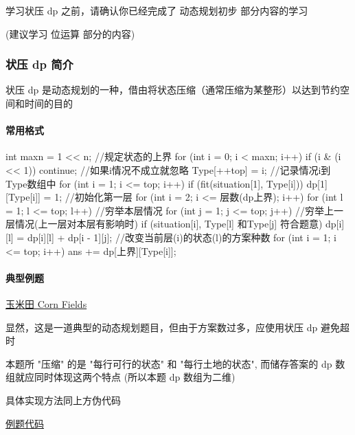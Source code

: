 
学习状压 dp 之前，请确认你已经完成了 动态规划初步 部分内容的学习

(建议学习 位运算 部分的内容)

\subsubsection{状压 dp 简介}

状压 dp 是动态规划的一种，借由将状态压缩（通常压缩为某整形）以达到节约空间和时间的目的

\paragraph{常用格式}

\begin{cppcode}
int maxn = 1 << n;  //规定状态的上界
for (int i = 0; i < maxn; i++) {
  if (i & (i << 1)) continue;  //如果i情况不成立就忽略
  Type[++top] = i;             //记录情况i到Type数组中
}
for (int i = 1; i <= top; i++) {
  if (fit(situation[1], Type[i])) dp[1][Type[i]] = 1;  //初始化第一层
}
for (int i = 2; i <= 层数(dp上界); i++) {
  for (int l = 1; l <= top; l++)  //穷举本层情况
    for (int j = 1; j <= top; j++)  //穷举上一层情况(上一层对本层有影响时)
      if (situation[i], Type[l] 和Type[j] 符合题意)
        dp[i][l] = dp[i][l] + dp[i - 1][j];  //改变当前层(i)的状态(l)的方案种数
}
for (int i = 1; i <= top; i++) ans += dp[上界][Type[i]];
\end{cppcode}

\paragraph{典型例题}

\href{https://www.luogu.org/problemnew/show/P1879}{玉米田 Corn Fields}

显然，这是一道典型的动态规划题目，但由于方案数过多，应使用状压 dp 避免超时

本题所 "压缩" 的是 "每行可行的状态" 和 "每行土地的状态", 而储存答案的 dp 数组就应同时体现这两个特点 (所以本题 dp 数组为二维)

具体实现方法同上方伪代码

\href{https://www.luogu.org/paste/kto3ua68}{例题代码}
